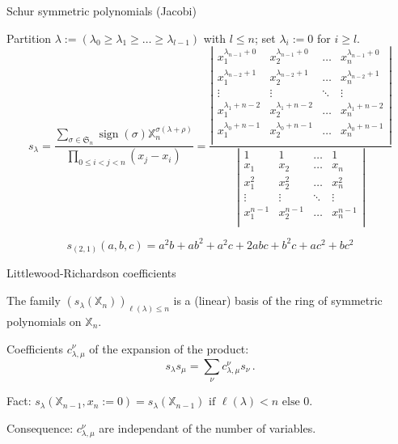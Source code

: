 \documentclass[compress,11pt]{beamer}
\newcommand{\XX}{{\mathbb X}}
\newcommand{\SG}{{\mathfrak S}}
\begin{document}
\begin{frame}{Schur symmetric polynomials (Jacobi)}

  \begin{DEFN}
    \small Partition $\lambda :=
    (\lambda_0\geq\lambda_1\geq\dots\geq\lambda_{l-1})$ with $l\leq
    n$; set $\lambda_i:=0$ for $i\geq l$.
    \[
    s_{\lambda} = 
    \frac{\sum_{\sigma\in\SG_n} \operatorname{sign}(\sigma)
      \XX_n^{\sigma(\lambda+\rho)}}%
    {\prod_{0\leq i<j<n} (x_j - x_i)}
    = \frac{\left|
       \begin{smallmatrix}
         x_1^{\lambda_{n-1}+0}  & x_2^{\lambda_{n-1}+0}   & \dots  & x_n^{\lambda_{n-1}+0}  \\
         x_1^{\lambda_{n-2}+1}  & x_2^{\lambda_{n-2}+1}   & \dots  & x_n^{\lambda_{n-2}+1}  \\
         \vdots & \vdots & \ddots & \vdots \\
         x_1^{\lambda_1+n-2}  & x_2^{\lambda_1+n-2}   & \dots  & x_n^{\lambda_1+n-2}  \\
         x_1^{\lambda_0+n-1}  & x_2^{\lambda_0+n-1}   & \dots  & x_n^{\lambda_0+n-1}  \\
      \end{smallmatrix}
      \right|
    }{\left|
       \begin{smallmatrix}
         1      & 1      & \dots  & 1     \\
         x_1    & x_2    & \dots  & x_n    \\
         x_1^2  & x_2^2   & \dots  & x_n^2  \\
         \vdots & \vdots & \ddots & \vdots \\
         x_1^{n-1}  & x_2^{n-1}   & \dots  & x_n^{n-1}  \\
      \end{smallmatrix}
      \right|
    }
    \]
  \end{DEFN}
  \[s_{(2,1)}(a,b,c) = a^2b + ab^2 + a^2c + 2abc + b^2c + ac^2 + bc^2\]
\end{frame}


\begin{frame}{Littlewood-Richardson coefficients}

  \begin{PROP}
    The family $(s_\lambda(\XX_n))_{\ell(\lambda) \leq n}$ is a (linear) basis of the
    ring of symmetric polynomials on $\XX_n$.
  \end{PROP}

  \begin{DEFN}
    Coefficients $c_{\lambda,\mu}^\nu$ of the expansion of the product:
    \[
    s_\lambda s_\mu = \sum_{\nu} c_{\lambda,\mu}^\nu s_\nu\,.
    \]
  \end{DEFN}
  Fact: $s_\lambda(\XX_{n-1}, x_n := 0) =
  s_\lambda(\XX_{n-1}) \text{ if } \ell(\lambda) < n\text{ else } 0$.

  Consequence: $c_{\lambda,\mu}^\nu$ are independant of the number of variables.
\end{frame}
\end{document}
